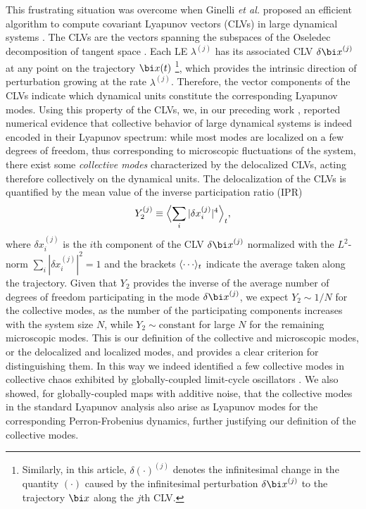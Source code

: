 \documentclass[12pt]{iopart}
\begin{document}
This frustrating situation was overcome when
 Ginelli \textit{et al.} proposed an efficient algorithm
 to compute covariant Lyapunov vectors (CLVs) in large dynamical systems
 \cite{Ginelli.etal-PRL2007,Ginelli.etal-JPA2012}.
The CLVs are the vectors spanning the subspaces of the Oseledec decomposition
 of tangent space \cite{Eckmann.Ruelle-RMP1985}.
Each LE $\lambda^{(j)}$ has its associated CLV $\delta\px^{(j)}$
 at any point on the trajectory $\px(t)$%
\footnote{
Similarly, in this article,
 $\delta(\cdot)^{(j)}$ denotes the infinitesimal change
 in the quantity $(\cdot)$ caused by the infinitesimal perturbation
 $\delta\px^{(j)}$ to the trajectory $\px$ along the $j$th CLV.
},
 which provides the intrinsic direction of perturbation
 growing at the rate $\lambda^{(j)}$.
Therefore, the vector components of the CLVs indicate
 which dynamical units constitute the corresponding Lyapunov modes.
Using this property of the CLVs, we, in our preceding work
 \cite{Takeuchi.etal-PRL2009}, reported numerical evidence
 that collective behavior of large dynamical systems is indeed
 encoded in their Lyapunov spectrum:
 while most modes are localized on a few degrees of freedom,
 thus corresponding to microscopic fluctuations of the system,
 there exist some \textit{collective modes} characterized
 by the delocalized CLVs, acting therefore collectively on the dynamical units.
The delocalization of the CLVs is quantified
 by the mean value of the inverse participation ratio (IPR)
 \cite{Mirlin-PR2000}
\begin{equation}
 Y_2^{(j)} \equiv \Bigl\langle{\sum_i |\delta x_i^{(j)}|^4}\Bigr\rangle_t,  \label{eq:Y2Def}
\end{equation}
 where $\delta x_i^{(j)}$ is the $i$th component of the CLV $\delta\px^{(j)}$
 normalized with the $L^2$-norm $\sum_i |\delta x_i^{(j)}|^2 = 1$
 and the brackets $\expct{\cdots}_t$ indicate
 the average taken along the trajectory.
Given that $Y_2$ provides the inverse of the average number
 of degrees of freedom participating in the mode $\delta\px^{(j)}$,
 we expect $Y_2 \sim 1/N$ for the collective modes,
 as the number of the participating components
 increases with the system size $N$,
 while $Y_2 \sim \mathrm{constant}$ for large $N$
 for the remaining microscopic modes.
This is our definition of the collective and microscopic modes,
 or the delocalized and localized modes,
 and provides a clear criterion for distinguishing them.
In this way we indeed identified a few collective modes
 in collective chaos exhibited by globally-coupled limit-cycle oscillators
 \cite{Takeuchi.etal-PRL2009}.
We also showed, for globally-coupled maps with additive noise,
 that the collective modes in the standard Lyapunov analysis
 also arise as Lyapunov modes for the corresponding Perron-Frobenius dynamics,
 further justifying our definition of the collective modes.
\end{document}
